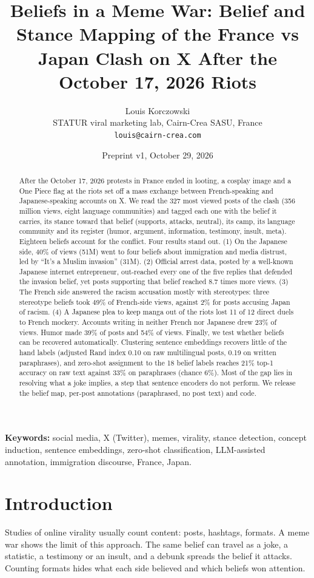 \documentclass[10pt,a4paper]{article}
\title{Beliefs in a Meme War: Belief and Stance Mapping of the France vs Japan Clash on X After the October 17, 2026 Riots}
\author{Louis Korczowski\\
\small STATUR viral marketing lab, Cairn-Crea SASU, France\\
\small \texttt{louis@cairn-crea.com}}
\date{Preprint v1, October 29, 2026}
\begin{document}
\maketitle

\begin{abstract}
After the October 17, 2026 protests in France ended in looting, a cosplay image and a One Piece flag at the riots set off a mass exchange between French-speaking and Japanese-speaking accounts on X. We read the 327 most viewed posts of the clash (356 million views, eight language communities) and tagged each one with the belief it carries, its stance toward that belief (supports, attacks, neutral), its camp, its language community and its register (humor, argument, information, testimony, insult, meta). Eighteen beliefs account for the conflict. Four results stand out. (1) On the Japanese side, 40\% of views (51M) went to four beliefs about immigration and media distrust, led by ``It's a Muslim invasion'' (31M). (2) Official arrest data, posted by a well-known Japanese internet entrepreneur, out-reached every one of the five replies that defended the invasion belief, yet posts supporting that belief reached 8.7 times more views. (3) The French side answered the racism accusation mostly with stereotypes: three stereotype beliefs took 49\% of French-side views, against 2\% for posts accusing Japan of racism. (4) A Japanese plea to keep manga out of the riots lost 11 of 12 direct duels to French mockery. Accounts writing in neither French nor Japanese drew 23\% of views. Humor made 39\% of posts and 54\% of views. Finally, we test whether beliefs can be recovered automatically. Clustering sentence embeddings recovers little of the hand labels (adjusted Rand index 0.10 on raw multilingual posts, 0.19 on written paraphrases), and zero-shot assignment to the 18 belief labels reaches 21\% top-1 accuracy on raw text against 33\% on paraphrases (chance 6\%). Most of the gap lies in resolving what a joke implies, a step that sentence encoders do not perform. We release the belief map, per-post annotations (paraphrased, no post text) and code.
\end{abstract}

\noindent\textbf{Keywords:} social media, X (Twitter), memes, virality, stance detection, concept induction, sentence embeddings, zero-shot classification, LLM-assisted annotation, immigration discourse, France, Japan.

\section{Introduction}
Studies of online virality usually count content: posts, hashtags, formats. A meme war shows the limit of this approach. The same belief can travel as a joke, a statistic, a testimony or an insult, and a debunk spreads the belief it attacks. Counting formats hides what each side believed and which beliefs won attention.
\end{document}
